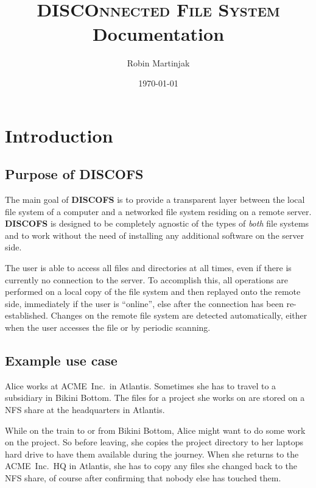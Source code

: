 \documentclass[a4paper]{article}
\title{\discofs \\ \textsc{\small \textbf{DISCO}nnected \textbf{F}ile \textbf{S}ystem} \\ Documentation}
\author{Robin Martinjak}
\date{\today}
\newcommand{\software}[1]{\textsc{\textbf{#1}}\xspace}
\newcommand{\discofs}{\software{DISCOFS}}
\begin{document}
\maketitle
\pagebreak

\tableofcontents
\pagebreak


\section{Introduction} %

\subsection{Purpose of \discofs} %
The main goal of \discofs is to provide a transparent layer between the local
file system of a computer and a networked file system residing on a remote
server. \discofs is designed to be completely agnostic of the types of
\emph{both} file systems and to work without the need of installing any
additional software on the server side.

The user is able to access all files and directories at all times, even if there
is currently no connection to the server. To accomplish this, all operations are
performed on a local copy of the file system and then replayed onto the remote
side, immediately if the user is ``online'', else after the connection has been
re-established. Changes on the remote file system are detected automatically,
either when the user accesses the file or by periodic scanning.

\subsection{Example use case} %
\newcommand{\somename}{Alice\xspace}
\newcommand{\somecompany}{ACME~Inc.\ }
\newcommand{\sometown}{Atlantis}
\newcommand{\anothertown}{Bikini Bottom}

\somename works at \somecompany in \sometown. Sometimes she has to travel 
to a subsidiary in \anothertown. The files for a project she works on are
stored on a NFS share at the headquarters in \sometown.

While on the train to or from \anothertown, \somename might want to do some work
on the project. So before leaving, she copies the project directory to her
laptops hard drive to have them available during the journey. When she returns
to the \somecompany HQ in \sometown, she has to copy any files she changed back
to the NFS share, of course after confirming that nobody else has touched them.
\end{document}
